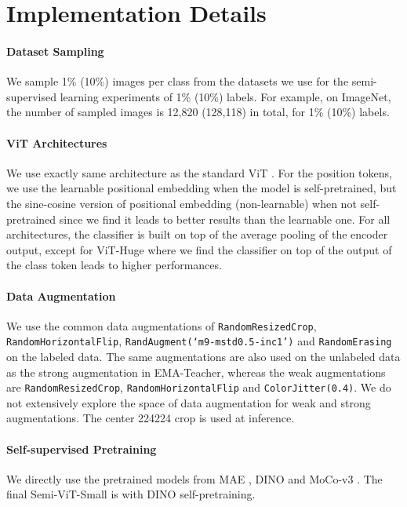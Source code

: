 \documentclass{article}
\begin{document}
{
\small


}




\newpage
\appendix


\section{Implementation Details}

\paragraph{Dataset Sampling} We sample 1\% (10\%) images per class from the datasets we use for the semi-supervised learning experiments of 1\% (10\%) labels. For example, on ImageNet, the number of sampled images is 12,820 (128,118) in total, for 1\% (10\%) labels.


\paragraph{ViT Architectures} We use exactly same architecture as the standard ViT \cite{DBLP:conf/iclr/DosovitskiyB0WZ21}. For the position tokens, we use the learnable positional embedding when the model is self-pretrained, but the sine-cosine version of positional embedding (non-learnable) when not self-pretrained since we find it leads to better results than the learnable one. For all architectures, the classifier is built on top of the average pooling of the encoder output, except for ViT-Huge where we find the classifier on top of the output of the class token leads to higher performances.

\paragraph{Data Augmentation}
We use the common data augmentations of \texttt{RandomResizedCrop}, \texttt{RandomHorizontalFlip}, \texttt{RandAugment(`m9-mstd0.5-inc1')} \cite{DBLP:conf/nips/CubukZS020} and \texttt{RandomErasing} \cite{DBLP:conf/aaai/Zhong0KL020} on the labeled data. The same augmentations are also used on the unlabeled data as the strong augmentation in EMA-Teacher, whereas the weak augmentations are  \texttt{RandomResizedCrop}, \texttt{RandomHorizontalFlip} and \texttt{ColorJitter(0.4)}. We do not extensively explore the space of data augmentation for weak and strong augmentations. The center 224224 crop is used at inference.

\paragraph{Self-supervised Pretraining} We directly use the pretrained models from MAE \cite{he2021masked}, DINO \cite{DBLP:conf/iccv/ChenXH21} and MoCo-v3 \cite{DBLP:conf/iccv/CaronTMJMBJ21}. The final Semi-ViT-Small is with DINO self-pretraining.
\end{document}
